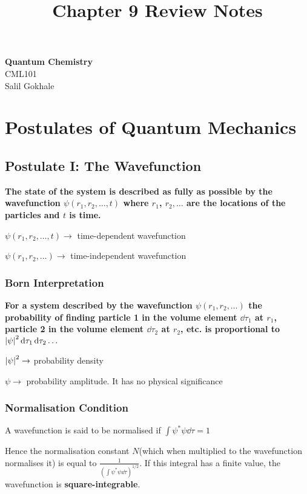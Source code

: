 \documentclass[11pt]{article}
\theoremstyle{definition}
\begin{document}
\setcounter{section}{8}
\title{Chapter 9 Review Notes}

\thispagestyle{empty}

\begin{center}
{\LARGE \bf Quantum Chemistry}\\
{\large CML101}\\
Salil Gokhale
\end{center}

\section{Postulates of Quantum Mechanics}
\subsection{Postulate I: The Wavefunction}

\textbf{The state of the system is described as fully as possible by the wavefunction $\psi(r_1, r_2,\dots ,t)$ where $r_1$, $r_2, \dots$ are the locations of the particles and $t$ is time.}

$\psi(r_1, r_2,\dots ,t) \rightarrow$ time-dependent wavefunction

$\psi(r_1, r_2,\dots) \rightarrow$ time-independent wavefunction

\subsubsection{Born Interpretation} 
\textbf{For a system described by the wavefunction $\psi(r_1, r_2, \dots)$ the probability of finding particle 1 in the volume element $\dd{\tau_1}$ at $r_1$, particle 2 in the volume element $\dd{\tau_2}$ at $r_2$, etc. is proportional to $\abs{\psi}^2 \dd{\tau_1} \dd{\tau_2} \dots$}

$\abs{\psi}^2 \rightarrow$ probability density

$\psi \rightarrow$ probability amplitude. It has no physical significance 

\subsubsection{Normalisation Condition} 

A wavefunction is said to be normalised if $\int \psi^* \psi \dd{\tau} =1$

Hence the normalisation constant $N$(which when multiplied to the wavefunction normalises it) is equal to $\frac{1}{\left(\int \psi^* \psi \dd{\tau} \right)^{1/2}}$. If this integral has a finite value, the wavefunction is \textbf{square-integrable}.
\end{document}
